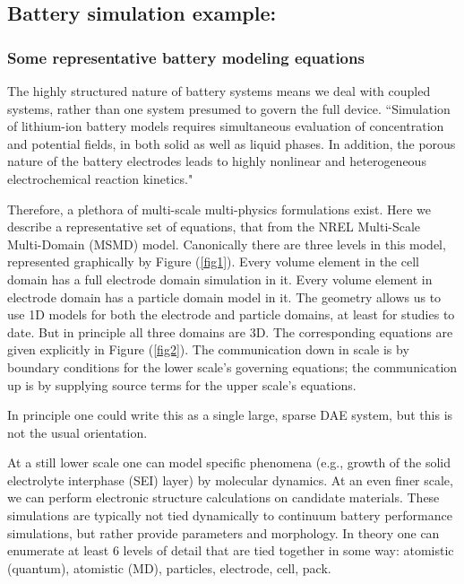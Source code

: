 \documentclass[11pt]{article}
\begin{document}

\subsection*{Battery simulation example:}
\subsubsection*{Some representative battery modeling equations}
The highly structured nature of battery systems means we deal with coupled systems, rather
than one system presumed to govern the full device.   
``Simulation of lithium-ion battery models requires simultaneous evaluation of concentration and potential fields, in both solid as well as liquid phases. In addition, the porous nature of the battery electrodes leads to highly nonlinear and heterogeneous electrochemical reaction kinetics." \cite{Subramanian:2009}

Therefore, a plethora of multi-scale multi-physics formulations exist.  Here we describe 
a representative set of equations, that from the NREL Multi-Scale Multi-Domain (MSMD) \cite{Kim-etal:2011} model.  Canonically there are
three levels in this model, represented graphically by Figure (\ref{fig1}). Every volume element in the cell domain has a full electrode
domain simulation in it.  Every volume element in electrode domain has a particle domain model in it.  The geometry allows us
to use 1D models for both the electrode and particle domains, at least for studies to date.  But in principle all three domains are 
3D.
The corresponding equations are given explicitly in Figure (\ref{fig2}).  The communication down in scale is by boundary
conditions for the lower scale's governing equations; the communication up is by supplying source terms for the upper scale's
equations. 

 In principle one could write this as a single large, sparse DAE system, but this is not the usual orientation.

At a still lower scale one can model specific phenomena (e.g., growth of the solid electrolyte interphase (SEI) layer) 
by molecular dynamics.  At an even finer scale, we can perform electronic structure calculations on candidate
materials.  These simulations are typically not tied dynamically to continuum battery performance simulations, but rather
provide parameters and morphology. In theory one can enumerate at least 6 levels of detail that are tied together in some way: 
atomistic (quantum), atomistic (MD), particles, electrode, cell, pack.
\end{document}
